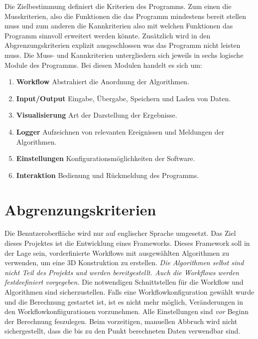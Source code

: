 Die Zielbestimmung definiert die Kriterien des Programms. Zum einen die Musskriterien, also die Funktionen die das Programm mindestens bereit stellen muss und zum anderen die Kannkriterien also mit welchen Funktionen das Programm sinnvoll erweitert werden könnte. Zusätzlich wird in den Abgrenzungskriterien explizit ausgeschlossen was das Programm nicht leisten muss. Die Muss- und Kannkriterien untergliedern sich jeweils in sechs logische Module des Programms. Bei diesen Modulen handelt es sich um:
\begin{enumerate}
	\item \textbf{Workflow} Abstrahiert die Anordnung der Algorithmen.
	\item \textbf{Input/Output} Eingabe, Übergabe, Speichern und Laden von Daten.
	\item \textbf{Visualisierung} Art der Darstellung der Ergebnisse.
	\item \textbf{Logger} Aufzeichnen von relevanten Ereignissen und Meldungen der Algorithmen.
	\item \textbf{Einstellungen} Konfigurationsmöglichkeiten der Software.
	\item \textbf{Interaktion} Bedienung und Rückmeldung des Programms.
\end{enumerate}

\section{Abgrenzungskriterien}
Die Benutzeroberfläche wird nur auf englischer Sprache umgesetzt.
Das Ziel dieses Projektes ist die Entwicklung eines Frameworks. Dieses Framework soll in der Lage sein, vorderfinierte Workflows mit ausgewählten Algorithmen zu verwenden, um eine 3D Konstruktion zu erstellen. \textit{Die Algorithmen selbst sind nicht Teil des Projekts und werden bereitgestellt. Auch die Workflows werden festdeefiniert vorgegeben.} Die notwendigen Schnittstellen für die Workflow und Algorithmen sind sicherzustellen.
Falls eine Workflowkonfiguration gewählt wurde und die Berechnung gestartet ist, ist es nicht mehr möglich, Veränderungen in den Workflowkonfiigurationen vorzunehmen. Alle Einstellungen sind \textit{vor} Beginn der Berechnung feszulegen. Beim vorzeitigen, manuellen Abbruch wird nicht sichergestellt, dass die bis zu den Punkt berechneten Daten verwendbar sind. 